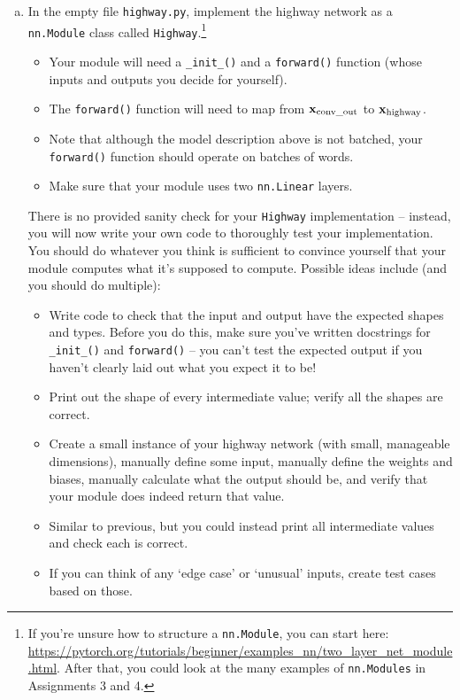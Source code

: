 \begin{enumerate}[(a)]
    \item \label{qn:highway} In the empty file \texttt{highway.py}, implement the highway network as a \texttt{nn.Module} class called \texttt{Highway}.\footnote{If you're unsure how to structure a \texttt{nn.Module}, you can start here: \url{https://pytorch.org/tutorials/beginner/examples_nn/two_layer_net_module.html}. After that, you could look at the many examples of \texttt{nn.Modules} in Assignments 3 and 4.} 
    \begin{itemize}
        \item Your module will need a \texttt{\_init\_()} and a \texttt{forward()} function (whose inputs and outputs you decide for yourself).
        \item The \texttt{forward()} function will need to map from $\mathbf{x}_\text{conv\_out}$ to $\mathbf{x}_\text{highway}$.
        \item Note that although the model description above is not batched, your \texttt{forward()} function should operate on batches of words.
        \item Make sure that your module uses two \texttt{nn.Linear} layers.
    \end{itemize}
    There is no provided sanity check for your \texttt{Highway} implementation -- instead, you will now write your own code to thoroughly test your implementation. 
    You should do whatever you think is sufficient to convince yourself that your module computes what it's supposed to compute. 
    Possible ideas include (and you should do multiple):
    \begin{itemize}
        \item Write code to check that the input and output have the expected shapes and types. Before you do this, make sure you've written docstrings for \texttt{\_init\_()} and \texttt{forward()} -- you can't test the expected output if you haven't clearly laid out what you expect it to be!
        \item Print out the shape of every intermediate value; verify all the shapes are correct.
        \item Create a small instance of your highway network (with small, manageable dimensions), manually define some input, manually define the weights and biases, manually calculate what the output should be, and verify that your module does indeed return that value.
        \item Similar to previous, but you could instead print all intermediate values and check each is correct.
        \item If you can think of any `edge case' or `unusual' inputs, create test cases based on those.
    \end{itemize}
    

\end{enumerate}
